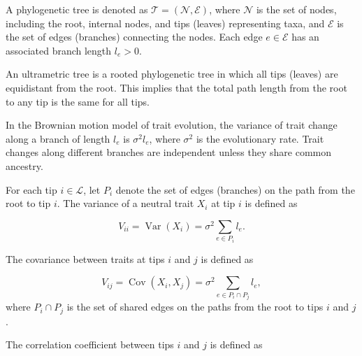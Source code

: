 {\begin{definition}
A phylogenetic tree is denoted as \( \mathcal{T} = (\mathcal{N}, \mathcal{E}) \), where \( \mathcal{N} \) is the set of nodes, including the root, internal nodes, and tips (leaves) representing taxa, and \( \mathcal{E} \) is the set of edges (branches) connecting the nodes. Each edge \( e \in \mathcal{E} \) has an associated branch length \( l_e > 0 \).
\end{definition}

\begin{definition}
An ultrametric tree is a rooted phylogenetic tree in which all tips (leaves) are equidistant from the root. This implies that the total path length from the root to any tip is the same for all tips.
\end{definition}

\begin{definition}
In the Brownian motion model of trait evolution, the variance of trait change along a branch of length \( l_e \) is \( \sigma^2 l_e \), where \( \sigma^2 \) is the evolutionary rate. Trait changes along different branches are independent unless they share common ancestry.
\end{definition}

\begin{definition}
For each tip \( i \in \mathcal{L} \), let \( P_i \) denote the set of edges (branches) on the path from the root to tip \( i \). The variance of a neutral trait \( X_i \) at tip \( i \) is defined as

\begin{equation}
    V_{ii} = \operatorname{Var}(X_i) = \sigma^2 \sum_{e \in P_i} l_e.
    \label{eq:variance_tip}
\end{equation}
\end{definition}

\begin{definition}
The covariance between traits at tips \( i \) and \( j \) is defined as

\begin{equation}
    V_{ij} = \operatorname{Cov}(X_i, X_j) = \sigma^2 \sum_{e \in P_i \cap P_j} l_e,
\end{equation}
where \( P_i \cap P_j \) is the set of shared edges on the paths from the root to tips \( i \) and \( j \).
\end{definition}

\begin{definition}
The correlation coefficient between tips \( i \) and \( j \) is defined as


\end{definition}}
